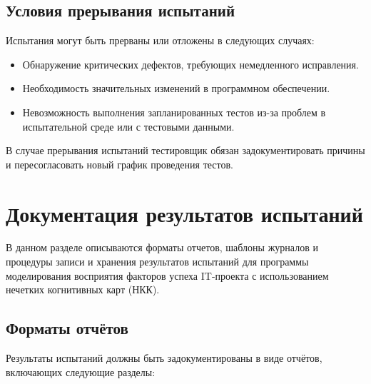 \documentclass{article}
\begin{document}
    \subsection{Условия прерывания испытаний}

    Испытания могут быть прерваны или отложены в следующих случаях:

    \begin{itemize}
        \item Обнаружение критических дефектов, требующих немедленного исправления.
        \item Необходимость значительных изменений в программном обеспечении.
        \item Невозможность выполнения запланированных тестов из-за проблем в испытательной среде или с тестовыми данными.
    \end{itemize}

    В случае прерывания испытаний тестировщик обязан задокументировать причины и пересогласовать новый график проведения тестов.
    \newpage
    \section{Документация результатов испытаний}

    В данном разделе описываются форматы отчетов, шаблоны журналов и процедуры записи и хранения результатов испытаний для программы моделирования восприятия факторов успеха IT-проекта с использованием нечетких когнитивных карт (НКК).

    \subsection{Форматы отчётов}

    Результаты испытаний должны быть задокументированы в виде отчётов, включающих следующие разделы:
\end{document}
